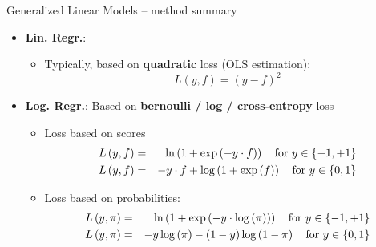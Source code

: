 \documentclass[11pt,compress,t,notes=noshow, xcolor=table]{beamer}
\begin{document}
\begin{frame2}{Generalized Linear Models -- method summary}
\begin{itemize}
  \item \textbf{Lin. Regr.}:
  \begin{itemize}
    
    \item Typically, based on \textbf{quadratic} loss (OLS estimation): 
    $$L\left(y, f\right) = \left(y - f \right)^2$$ %
  \end{itemize}
  \item \textbf{Log. Regr.}: Based on \textbf{bernoulli / log / cross-entropy} loss ~ 
  \begin{itemize}
      \item Loss based on scores
      \begin{eqnarray*}
    L\left(y, f\right) &=& \ln\left(1+\exp\left(-y \cdot f\right)\right) \quad \text{for } y \in \{-1, +1\}\\
    L\left(y, f\right) &=& - y \cdot f + \log\left(1 + \exp\left(f\right)\right) \quad \text{for } y \in \{0, 1\} 
    \end{eqnarray*}
    \item Loss based on probabilities:
      \begin{eqnarray*}
    L\left(y, \pi\right) &=& \ln\left(1+\exp\left(-y \cdot \log \left(\pi\right)\right)\right) \quad \text{for } y \in \{-1, +1\}\\
    L\left(y, \pi\right) &=& -y \log \left(\pi\right) - (1 - y) \log \left(1 - \pi \right)  \quad \text{for } y \in \{0, 1\} 
    \end{eqnarray*}
  \end{itemize}
\end{itemize}
\end{frame2}
\end{document}
